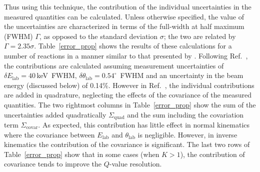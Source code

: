 Thus using this technique, the contribution of the individual uncertainties in the measured quantities can be calculated.  Unless otherwise specified, the value of the uncertainties are characterized in terms of the full-width at half maximum (FWHM) $\Gamma$, as opposed to the standard deviation $\sigma$; the two are related by $\Gamma=2.35\sigma$.   Table~\ref{error_prop} shows the results of these calculations for a number of reactions in a manner similar to that presented by \citet{Winfield_1997}.  Following Ref.~\cite{Winfield_1997}, the contributions are calculated assuming measurement uncertainties of $\delta E_\mathrm{lab}=40$\,keV~FWHM, $\delta \theta_\mathrm{lab}=0.54^\circ$~FWHM and an uncertainty in the beam energy (discussed below) of 0.14\%.  However in Ref.~\cite{Winfield_1997}, the individual contributions are added in quadrature, neglecting the effects of the covariance of the measured quantities.  The two rightmost columns in Table~\ref{error_prop} show the sum of the uncertainties added quadratically $\Sigma_\textrm{quad}$ and the sum including the covariation term $\Sigma_\textrm{covar}$.  As expected, this contribution has little effect in normal kinematics where the covariance between $E_\mathrm{lab}$ and $\theta_\mathrm{lab}$ is negligible.  However, in inverse kinematics the contribution of the covariance is significant.  The last two rows of Table~\ref{error_prop} show that in some cases (when $K>1$), the contribution of covariance tends to improve the $Q$-value resolution.

